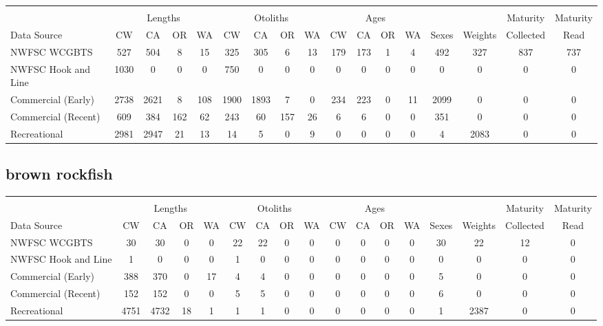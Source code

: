 \documentclass[12pt,]{article}
\begin{document}
\begin{table}[ht]
\centering
\begingroup\fontsize{10pt}{10pt}\selectfont
\begin{tabular}{|l|cccc|cccc|cccc|c|c|c|c|}
  \hline
 &  &  &  &  &  &  &  &  &  &  &  &  &  &  &  &  \\ 
   & \multicolumn{4}{c}{Lengths} &  \multicolumn{4}{c}{Otoliths} & \multicolumn{4}{c}{Ages} &  & & Maturity & Maturity\\
 Data Source & CW & CA & OR & WA & CW & CA & OR & WA & CW & CA & OR & WA & Sexes & Weights & Collected & Read\\
 \hline
NWFSC WCGBTS & 527 & 504 & 8 & 15 & 325 & 305 & 6 & 13 & 179 & 173 & 1 & 4 & 492 & 327 & 837 & 737 \\ 
  NWFSC Hook and Line & 1030 & 0 & 0 & 0 & 750 & 0 & 0 & 0 & 0 & 0 & 0 & 0 & 0 & 0 & 0 & 0 \\ 
  Commercial (Early) & 2738 & 2621 & 8 & 108 & 1900 & 1893 & 7 & 0 & 234 & 223 & 0 & 11 & 2099 & 0 & 0 & 0 \\ 
  Commercial (Recent) & 609 & 384 & 162 & 62 & 243 & 60 & 157 & 26 & 6 & 6 & 0 & 0 & 351 & 0 & 0 & 0 \\ 
  Recreational & 2981 & 2947 & 21 & 13 & 14 & 5 & 0 & 9 & 0 & 0 & 0 & 0 & 4 & 2083 & 0 & 0 \\ 
   \hline
\end{tabular}
\endgroup
\end{table}

\FloatBarrier  

\newpage  

\subsection{brown rockfish}\label{brown-rockfish}

\begin{table}[ht]
\centering
\begingroup\fontsize{10pt}{10pt}\selectfont
\begin{tabular}{|l|cccc|cccc|cccc|c|c|c|c|}
  \hline
 &  &  &  &  &  &  &  &  &  &  &  &  &  &  &  &  \\ 
   & \multicolumn{4}{c}{Lengths} &  \multicolumn{4}{c}{Otoliths} & \multicolumn{4}{c}{Ages} &  & & Maturity & Maturity\\
 Data Source & CW & CA & OR & WA & CW & CA & OR & WA & CW & CA & OR & WA & Sexes & Weights & Collected & Read\\
 \hline
NWFSC WCGBTS & 30 & 30 & 0 & 0 & 22 & 22 & 0 & 0 & 0 & 0 & 0 & 0 & 30 & 22 & 12 & 0 \\ 
  NWFSC Hook and Line & 1 & 0 & 0 & 0 & 1 & 0 & 0 & 0 & 0 & 0 & 0 & 0 & 0 & 0 & 0 & 0 \\ 
  Commercial (Early) & 388 & 370 & 0 & 17 & 4 & 4 & 0 & 0 & 0 & 0 & 0 & 0 & 5 & 0 & 0 & 0 \\ 
  Commercial (Recent) & 152 & 152 & 0 & 0 & 5 & 5 & 0 & 0 & 0 & 0 & 0 & 0 & 6 & 0 & 0 & 0 \\ 
  Recreational & 4751 & 4732 & 18 & 1 & 1 & 1 & 0 & 0 & 0 & 0 & 0 & 0 & 1 & 2387 & 0 & 0 \\ 
   \hline
\end{tabular}
\endgroup
\end{table}
\end{document}
